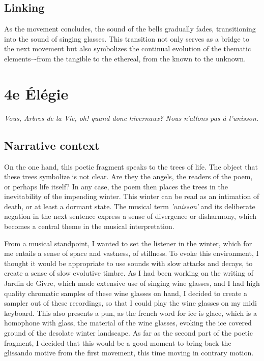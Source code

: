 \documentclass[12pt,twoside,maitrise]{dms_ks}
\theoremstyle{definition}
\begin{document}

\subsection{Linking}

As the movement concludes, the sound of the bells gradually fades, transitioning into the sound of singing glasses.
This transition not only serves as a bridge to the next movement but also symbolizes the continual evolution of the thematic elements–-from the tangible to the ethereal, from the known to the unknown.

\section{4e Élégie}

\epigraph{\textit{Vous, Arbres de la Vie, oh! quand donc hivernaux? Nous n'allons pas à l'unisson.}}{}

\subsection{Narrative context}

On the one hand, this poetic fragment speaks to the trees of life.
The object that these trees symbolize is not clear.
Are they the angels, the readers of the poem, or perhaps life itself?
In any case, the poem then places the trees in the inevitability of the impending winter.
This winter can be read as an intimation of death, or at least a dormant state.
The musical term \textit{'unisson'} and its deliberate negation in the next sentence express a sense of divergence or disharmony, which becomes a central theme in the musical interpretation.

From a musical standpoint, I wanted to set the listener in the winter, which for me entails a sense of space and vastness, of stillness.
To evoke this environment, I thought it would be appropriate to use sounds with slow attacks and decays, to create a sense of slow evolutive timbre.
As I had been working on the writing of Jardin de Givre, which made extensive use of singing wine glasses, and I had high quality chromatic samples of these wine glasses on hand, I decided to create a sampler out of these recordings, so that I could play the wine glasses on my midi keyboard.
This also presents a pun, as the french word for ice is glace, which is a homophone with glass, the material of the wine glasses, evoking the ice covered ground of the desolate winter landscape.
As far as the second part of the poetic fragment, I decided that this would be a good moment to bring back the glissando motive from the first movement, this time moving in contrary motion.
\end{document}

